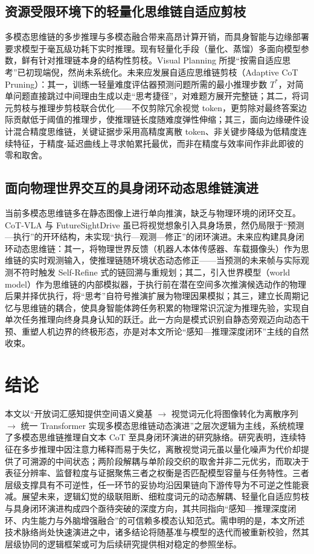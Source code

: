 \documentclass[twocolumn]{ctexart}
\begin{document}
\subsection{资源受限环境下的轻量化思维链自适应剪枝}\label{sec:ch:prune}
多模态思维链的多步推理与多模态融合带来高昂计算开销，而具身智能与边缘部署要求模型于毫瓦级功耗下实时推理。现有轻量化手段（量化、蒸馏）多面向模型参数，鲜有针对推理链本身的结构性剪枝。Visual Planning 所提“按需自适应思考”已初现端倪，然尚未系统化。未来应发展自适应思维链剪枝（Adaptive CoT Pruning）：其一，训练一轻量难度评估器预测问题所需的最小推理步数 $T^{*}$，对简单问题直接跳过中间理由生成以走“思考捷径”，对难题方展开完整链；其二，将词元剪枝与推理步剪枝联合优化——不仅剪除冗余视觉 token，更剪除对最终答案边际贡献低于阈值的推理步，使推理链长度随难度弹性伸缩；其三，面向边缘硬件设计混合精度思维链，关键证据步采用高精度离散 token、非关键步降级为低精度连续特征，于精度-延迟曲线上寻求帕累托最优，而非在精度与效率间作非此即彼的零和取舍。

\subsection{面向物理世界交互的具身闭环动态思维链演进}\label{sec:ch:embodied}
当前多模态思维链多在静态图像上进行单向推演，缺乏与物理环境的闭环交互。CoT-VLA\cite{zhao2025cotvla} 与 FutureSightDrive\cite{zhang2025fsd} 虽已将视觉想象引入具身场景，然仍局限于“预测—执行”的开环结构，未实现“执行—观测—修正”的闭环演进。未来应构建具身闭环动态思维链：其一，将物理世界反馈（机器人本体传感器、车载摄像头）作为思维链的实时观测输入，使推理链随环境状态动态修正——当预测的未来帧与实际观测不符时触发 Self-Refine 式的链回溯与重规划；其二，引入世界模型（world model）作为思维链的内部模拟器，于执行前在潜在空间多次推演候选动作的物理后果并择优执行，将“思考”自符号推演扩展为物理因果模拟；其三，建立长周期记忆与思维链的耦合，使具身智能体跨任务积累的物理常识沉淀为推理先验，实现自单次任务推理向终身具身认知的跃迁。此一方向是模式识别自静态旁观迈向动态干预、重塑人机边界的终极形态，亦是对本文所论“感知—推理深度闭环”主线的自然收束。

\section{结论}\label{sec:conclusion}
本文以“开放词汇感知提供空间语义奠基 $\rightarrow$ 视觉词元化将图像转化为离散序列 $\rightarrow$ 统一 Transformer 实现多模态思维链动态演进”之层次逻辑为主线，系统梳理了多模态思维链推理自文本 CoT 至具身闭环演进的研究脉络。研究表明，连续特征在多步推理中因注意力稀释而易于失忆，离散视觉词元虽以量化噪声为代价却提供了可溯源的中间状态；两阶段解耦与单阶段交织的取舍并非二元优劣，而取决于表征分辨率、监督粒度与证据聚焦三者之权衡是否匹配模型容量与任务特性。三者层级支撑具有不可逆性，任一环节的妥协均沿因果链向下游传导为不可逆之性能衰减。展望未来，逻辑幻觉的级联阻断、细粒度词元的动态解耦、轻量化自适应剪枝与具身闭环演进构成四个亟待突破的深度方向，其共同指向“感知—推理深度闭环、内生能力与外脑增强融合”的可信赖多模态认知范式。需申明的是，本文所述技术脉络尚处快速演进之中，诸多结论将随基准与模型的迭代而被重新校验，然其层级协同的逻辑框架或可为后续研究提供相对稳定的参照坐标。
\end{document}

